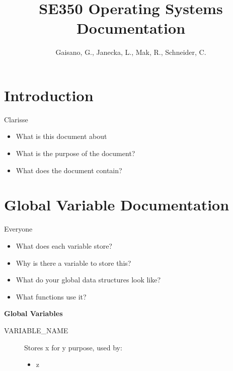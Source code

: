 \documentclass[11pt, oneside]{article}
\title{SE350 Operating Systems Documentation}
\author{Gaisano, G., Janecka, L., Mak, R., Schneider, C.}
\begin{document}
\maketitle

\section{Introduction}
Clarisse
\begin{itemize}
\item What is this document about
\item What is the purpose of the document?
\item What does the document contain?
\end{itemize}

\section{Global Variable Documentation}
Everyone
\begin{itemize}
\item What does each variable store?
\item Why is there a variable to store this?
\item What do your global data structures look like?
\item What functions use it?
\end{itemize}

{\bf Global Variables}
\begin{description}
\item [VARIABLE\_NAME] Stores x for y purpose, used by:
\begin{itemize}
\item z
\end{itemize}
\end{description}
\end{document}

